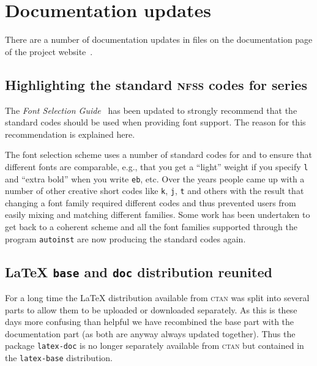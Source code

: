 \documentclass{ltnews}
\providecommand\acro[1]{\textsc{#1}}
\providecommand\CTAN{\textsc{ctan}}
\begin{document}
\section{Documentation updates}

There are a number of
documentation updates in files
on the documentation page of the project website~\cite{30:site-doc}.

\subsection{Highlighting the standard \texorpdfstring{\acro{nfss}}{NFSS} codes for series}

The \emph{Font Selection Guide}~\cite{fntguide} has been
updated to strongly recommend that the standard codes should be used
when providing font support.  The reason for this recommendation is explained here.


The font selection scheme uses a number of standard codes for
 and  to ensure that different fonts are
comparable, e.g., that you get a \enquote{light} weight if you specify
\texttt{l} and \enquote{extra bold} when you write \texttt{eb},
etc. Over the years people came up with a number of other creative
short codes like \texttt{k}, \texttt{j}, \texttt{t} and others with
the result that changing a font family required different codes and
thus prevented users from easily mixing and matching different
families.
Some work has been undertaken to get back to a coherent scheme and
all the font families supported through the program \texttt{autoinst}
are now producing the standard codes again.


\subsection{\LaTeX{} \texttt{base} and \texttt{doc} distribution reunited}

For a long time the \LaTeX{} distribution available from \CTAN{} was
split into several parts to allow them to be uploaded or downloaded
separately. As this is these days more confusing than helpful we have
recombined the base part with the documentation part (as both are
anyway always updated together). Thus the package \texttt{latex-doc}
is no longer separately available from \CTAN{} but contained in the
\texttt{latex-base} distribution.
\end{document}
